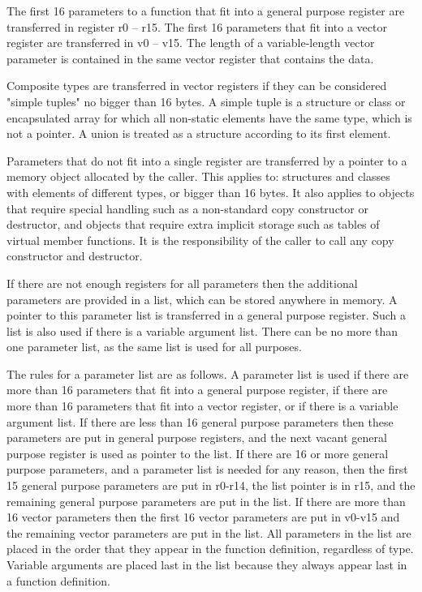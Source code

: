 \documentclass[forwardcom.tex]{subfiles}
\begin{document}
The first 16 parameters to a function that fit into a general purpose register are transferred in register r0 – r15. The first 16 parameters that fit into a vector register are transferred in v0 – v15. The length of a variable-length vector parameter is contained in the same vector register that contains the data. 
\vspace{2mm}

Composite types are transferred in vector registers if they can be considered "simple tuples" no bigger than 16 bytes. A simple tuple is a structure or class or encapsulated array for which all non-static elements have the same type, which is not a pointer. A union is treated as a structure according to its first element. 
\vspace{2mm}

Parameters that do not fit into a single register are transferred by a pointer to a memory object allocated by the caller. This applies to: structures and classes with elements of different types, or bigger than 16 bytes. It also applies to objects that require special handling such as a non-standard copy constructor or destructor, and objects that require extra implicit storage such as tables of virtual member functions. It is the responsibility of the caller to call any copy constructor and destructor.
\vspace{2mm}

If there are not enough registers for all parameters then the additional parameters are provided in a list, which can be stored anywhere in memory. A pointer to this parameter list is transferred in a general purpose register. Such a list is also used if there is a variable argument list. There can be no more than one parameter list, as the same list is used for all purposes. 
\vspace{2mm}

The rules for a parameter list are as follows. A parameter list is used if there are more than 16 parameters that fit into a general purpose register, if there are more than 16 parameters that fit into a vector register, or if there is a variable argument list. If there are less than 16 general purpose parameters then these parameters are put in general purpose registers, and the next vacant general purpose register is used as pointer to the list. If there are 16 or more general purpose parameters, and a parameter list is needed for any reason, then the first 15 general purpose parameters are put in r0-r14, the list pointer is in r15, and the remaining general purpose parameters are put in the list. If there are more than 16 vector parameters then the first 16 vector parameters are put in v0-v15 and the remaining vector parameters are put in the list. All parameters in the list are placed in the order that they appear in the function definition, regardless of type. Variable arguments are placed last in the list because they always appear last in a function definition. 
\vspace{2mm}
\end{document}
